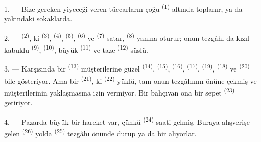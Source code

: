 
\VUsaut{4.0mm}
\VUsaut{3.0mm}

\VUsaut{3.0mm}

1. --- Bize gereken yiyeceği veren tüccarların çoğu 
 \textsuperscript{(1)} altında toplanır, ya da yakındaki
sokaklarda.

2. ---  \textsuperscript{(2)}, ki 
\textsuperscript{(3)},  \textsuperscript{(4)},
 \textsuperscript{(5)}, 
\textsuperscript{(6)} ve  \textsuperscript{(7)} satar,
 \textsuperscript{(8)} yanına
oturur; onun tezgâhı da kızıl kabuklu 
\textsuperscript{(9)},  \textsuperscript{(10)}, büyük
 \textsuperscript{(11)} ve taze
 \textsuperscript{(12)} süslü.

3. --- Karşısında bir  \textsuperscript{(13)}
müşterilerine güzel  \textsuperscript{(14)},
 \textsuperscript{(15)}, 
\textsuperscript{(16)},  \textsuperscript{(17)},
 \textsuperscript{(19)}, 
\textsuperscript{(18)} ve  \textsuperscript{(20)} bile
gösteriyor. Ama bir   \textsuperscript{(21)},
ki  \textsuperscript{(22)} yüklü, tam onun
tezgâhının önüne çekmiş ve müşterilerinin yaklaşmasına izin
vermiyor. Bir bahçıvan ona bir sepet  \textsuperscript{(23)}
getiriyor.

\VUsaut{4.0mm}
\VUsaut{3.0mm}

4. --- Pazarda büyük bir hareket var, çünkü 
\textsuperscript{(24)} saati gelmiş. Buraya alışverişe gelen
 \textsuperscript{(26)} yolda 
\textsuperscript{(25)} tezgâhı önünde durup  ya da bir
 alıyorlar.

